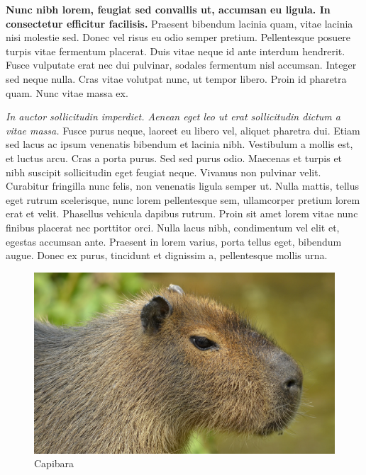 \begin{center}
\textbf{Nunc nibh lorem, feugiat sed convallis ut, accumsan eu ligula. In consectetur efficitur facilisis.} Praesent bibendum lacinia quam, vitae lacinia nisi molestie sed. Donec vel risus eu odio semper pretium. Pellentesque posuere turpis vitae fermentum placerat. Duis vitae neque id ante interdum hendrerit. Fusce vulputate erat nec dui pulvinar, sodales fermentum nisl accumsan. Integer sed neque nulla. Cras vitae volutpat nunc, ut tempor libero. Proin id pharetra quam. Nunc vitae massa ex.

\textit{In auctor sollicitudin imperdiet. Aenean eget leo ut erat sollicitudin dictum a vitae massa.} Fusce purus neque, laoreet eu libero vel, aliquet pharetra dui. Etiam sed lacus ac ipsum venenatis bibendum et lacinia nibh. Vestibulum a mollis est, et luctus arcu. Cras a porta purus. Sed sed purus odio. Maecenas et turpis et nibh suscipit sollicitudin eget feugiat neque. Vivamus non pulvinar velit. Curabitur fringilla nunc felis, non venenatis ligula semper ut. Nulla mattis, tellus eget rutrum scelerisque, nunc lorem pellentesque sem, ullamcorper pretium lorem erat et velit. Phasellus vehicula dapibus rutrum. Proin sit amet lorem vitae nunc finibus placerat nec porttitor orci. Nulla lacus nibh, condimentum vel elit et, egestas accumsan ante. Praesent in lorem varius, porta tellus eget, bibendum augue. Donec ex purus, tincidunt et dignissim a, pellentesque mollis urna.
\end{center}
\begin{figure}[h!]
  \includegraphics[scale=1.3]{pictures/Pszym/cap.jpg}
  \caption{Capibara}
  \label{fig:capibara}
\end{figure}